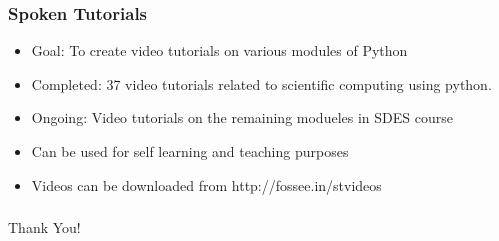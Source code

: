 \documentclass{beamer}
\begin{document}
\begin{frame}
	\frametitle{Spoken Tutorials}
	\begin{itemize}
	\item Goal: To create video tutorials on various modules of Python
	\item Completed: 37 video tutorials related to scientific computing using python.
	\item Ongoing: Video tutorials on the remaining modueles in SDES course
	\item Can be used for self learning and teaching purposes
	\item Videos can be downloaded from http://fossee.in/stvideos	
	\end{itemize}
\end{frame}


\begin{frame}
\frametitle{}   
  \begin{center}
    \Huge{Thank You!}
  \end{center}
\end{frame}
\end{document}
